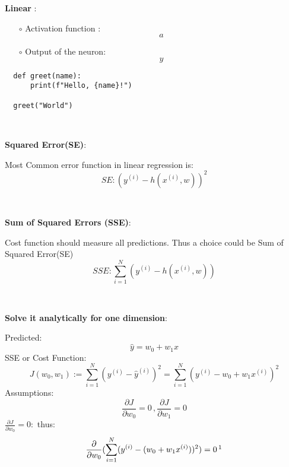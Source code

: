 \documentclass{article}
\newenvironment{cheatformula}[1][כותרת]{
    \begin{minipage}{\linewidth}
    \textbf{#1}:
}{
    \end{minipage}\\[0ex]
}
\begin{document}
\begin{multicols*}{2}
\begin{cheatformula}[Linear ]
\begin{itemize}
  
  \item[$\circ$] Activation function :
  \begin{equation}
  a
  \end{equation}

  
  \item[$\circ$] Output of the neuron:
  \begin{equation}
  y
  \end{equation}
\end{itemize}

\begin{lstlisting}
  def greet(name):
      print(f"Hello, {name}!")
  
  greet("World")
  \end{lstlisting}

\end{cheatformula}

\begin{cheatformula}[Squared Error(SE)] 
Most Common error function in linear regression is:
\begin{equation}
SE: ( y^{(i)} - h(x^{(i)}, w))^{2}
\end{equation}
\end{cheatformula}



\begin{cheatformula}[Sum of Squared Errors (SSE)]
Cost function should measure all predictions. Thus a choice could be Sum of Squared Error(SE)
\begin{equation}
SSE: \sum_{i=1}^{N}(y^{(i)} - h(x^{(i)}, w) )
\end{equation}
\end{cheatformula}

\begin{cheatformula}[Solve it analytically for one dimension]
Predicted:
\begin{equation}
\widehat{y} = w_{0} + w_{1}x
\end{equation}
SSE or Cost Function:
\begin{equation}
J(w_{0}, w_{1}) := \sum_{i=1}^{N}(y^{(i)} - \widehat{y}^{(i)})^{2} = \sum_{i=1}^{N}(y^{(i)} -  w_{0} + w_{1}x^{(i)})^{2}
\end{equation}
Assumptions:
\begin{equation}
\frac{\partial J}{\partial w_{0}} = 0 \,, \frac{\partial J}{\partial w_{1}} = 0
\end{equation}
$\frac{\partial J}{\partial w_{0}} = 0:$ thus:
\begin{equation}
\frac{\partial }{\partial w_{0}}  ( \sum_{i=1}^{N}(y^{(i)} -  (w_{0} + w_{1}x^{(i)}))^{2}) = 0  \, \footnotemark
\end{equation}


\end{cheatformula}
\end{multicols*}
\end{document}
